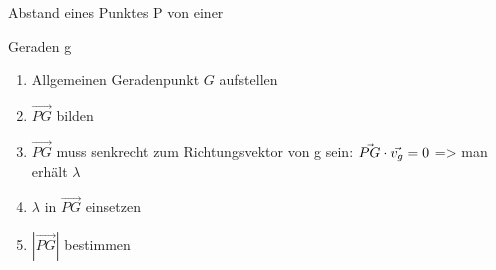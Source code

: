 \documentclass[paper=a6,ngerman,twoside=true,fontsize=14pt, parskip = half]{scrartcl}
\begin{document}
\begin{frage}
	 Abstand eines Punktes P von einer 
	 
	 Geraden g
	
\end{frage}
\begin{antwort}
	\begin{enumerate} 
		\item Allgemeinen Geradenpunkt $G$ aufstellen
		\item $\vec{PG}$ bilden
		\item $\vec{PG}$ muss senkrecht zum Richtungsvektor von g sein: $\vec{PG} \cdot \vec{v_g}=0$ => man erhält $\lambda$
		
		\item $\lambda$ in  $\vec{PG}$ einsetzen
		\item $|\vec{PG}|$ bestimmen
		
	\end{enumerate} 
\end{antwort}			
\end{document}

